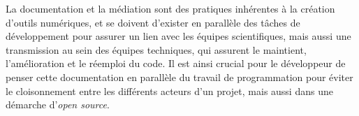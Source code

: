 	La documentation et la médiation sont des pratiques inhérentes à la création d'outils numériques, et se doivent d'exister en parallèle des tâches de développement pour assurer un lien avec les équipes scientifiques, mais aussi une transmission au sein des équipes techniques, qui assurent le maintient, l'amélioration et le réemploi du code. Il est ainsi crucial pour le développeur de penser cette documentation en parallèle du travail de programmation pour éviter le cloisonnement entre les différents acteurs d'un projet, mais aussi dans une démarche d'\textit{open source}.
